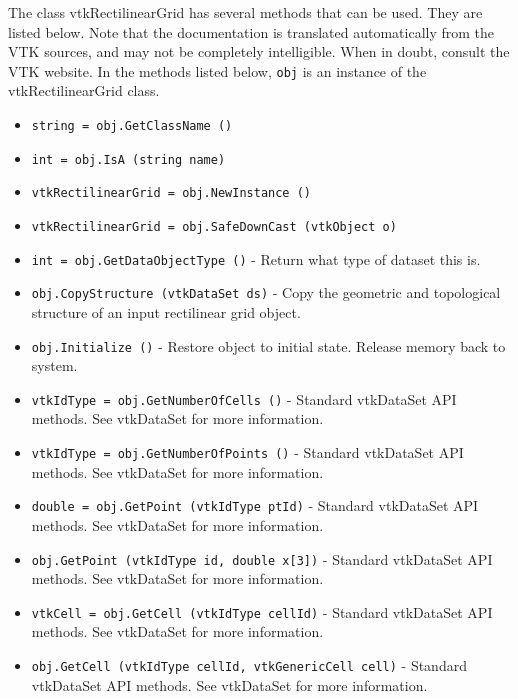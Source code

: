The class vtkRectilinearGrid has several methods that can be used.
  They are listed below.
Note that the documentation is translated automatically from the VTK sources,
and may not be completely intelligible.  When in doubt, consult the VTK website.
In the methods listed below, \verb|obj| is an instance of the vtkRectilinearGrid class.
\begin{itemize}
\item  \verb|string = obj.GetClassName ()|

\item  \verb|int = obj.IsA (string name)|

\item  \verb|vtkRectilinearGrid = obj.NewInstance ()|

\item  \verb|vtkRectilinearGrid = obj.SafeDownCast (vtkObject o)|

\item  \verb|int = obj.GetDataObjectType ()| -  Return what type of dataset this is.

\item  \verb|obj.CopyStructure (vtkDataSet ds)| -  Copy the geometric and topological structure of an input rectilinear grid
 object.

\item  \verb|obj.Initialize ()| -  Restore object to initial state. Release memory back to system.

\item  \verb|vtkIdType = obj.GetNumberOfCells ()| -  Standard vtkDataSet API methods. See vtkDataSet for more information.

\item  \verb|vtkIdType = obj.GetNumberOfPoints ()| -  Standard vtkDataSet API methods. See vtkDataSet for more information.

\item  \verb|double = obj.GetPoint (vtkIdType ptId)| -  Standard vtkDataSet API methods. See vtkDataSet for more information.

\item  \verb|obj.GetPoint (vtkIdType id, double x[3])| -  Standard vtkDataSet API methods. See vtkDataSet for more information.

\item  \verb|vtkCell = obj.GetCell (vtkIdType cellId)| -  Standard vtkDataSet API methods. See vtkDataSet for more information.

\item  \verb|obj.GetCell (vtkIdType cellId, vtkGenericCell cell)| -  Standard vtkDataSet API methods. See vtkDataSet for more information.


\end{itemize}
